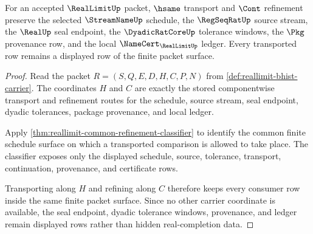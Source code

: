 \begin{theorem}
\label{thm:reallimit-transport-stability-boundary}
For an accepted $\RealLimitUp$ packet, $\hsame$ transport and $\Cont$
refinement preserve the selected $\StreamNameUp$ schedule, the
$\RegSeqRatUp$ source stream, the $\RealUp$ seal endpoint, the
$\DyadicRatCoreUp$ tolerance windows, the $\Pkg$ provenance row, and the local
$\NameCert_{\RealLimitUp}$ ledger. Every transported row remains a displayed
row of the finite packet surface.
\end{theorem}
\begin{proof}
Read the packet $R=(S,Q,E,D,H,C,P,N)$ from
\autoref{def:reallimit-bhist-carrier}. The coordinates $H$ and $C$ are exactly
the stored componentwise transport and refinement routes for the schedule,
source stream, seal endpoint, dyadic tolerances, package provenance, and local
ledger.

Apply \autoref{thm:reallimit-common-refinement-classifier} to identify the
common finite schedule surface on which a transported comparison is allowed to
take place. The classifier exposes only the displayed schedule, source,
tolerance, transport, continuation, provenance, and certificate rows.

Transporting along $H$ and refining along $C$ therefore keeps every consumer
row inside the same finite packet surface. Since no other carrier coordinate is
available, the seal endpoint, dyadic tolerance windows, provenance, and ledger
remain displayed rows rather than hidden real-completion data.
\end{proof}

